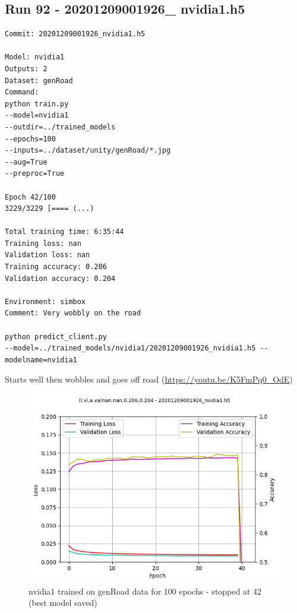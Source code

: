 \subsection{Run 92 - 20201209001926\_ nvidia1.h5 }
\label{app_res:92}
\begin{verbatim}
Commit: 20201209001926_nvidia1.h5

Model: nvidia1 
Outputs: 2
Dataset: genRoad
Command:
python train.py
--model=nvidia1
--outdir=../trained_models
--epochs=100
--inputs=../dataset/unity/genRoad/*.jpg
--aug=True
--preproc=True

Epoch 42/100
3229/3229 [==== (...)

Total training time: 6:35:44
Training loss: nan
Validation loss: nan
Training accuracy: 0.206
Validation accuracy: 0.204

Environment: simbox
Comment: Very wobbly on the road

python predict_client.py
--model=../trained_models/nvidia1/20201209001926_nvidia1.h5 --modelname=nvidia1
\end{verbatim}

Starts well then wobbles and goes off road (\url{https://youtu.be/K5FmPq0_OdE})
\begin{figure}[ht]
 \centering 
 \includegraphics[width=\textwidth]{Figures/20201209001926_nvidia1_accuracy.png}
 \caption{nvidia1 trained on genRoad data for 100 epochs - stopped at 42 (best model saved)}
 \label{fig:20201209001926_nvidia1_accuracy} 
\end{figure}


